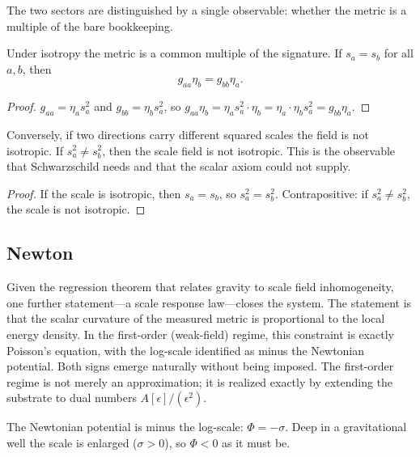 The two sectors are distinguished by a single observable: whether the metric is a multiple of the bare bookkeeping.

\begin{theorem}
Under isotropy the metric is a common multiple of the signature. If $s_a = s_b$ for all $a,b$, then
$$g_{aa}\eta_b = g_{bb}\eta_a.$$
\end{theorem}

\begin{proof}
$g_{aa} = \eta_a s_a^2$ and $g_{bb} = \eta_b s_a^2$, so $g_{aa}\eta_b = \eta_a s_a^2 \cdot \eta_b = \eta_a \cdot \eta_b s_a^2 = g_{bb}\eta_a$.
\end{proof}

\begin{theorem}
Conversely, if two directions carry different squared scales the field is not isotropic. If $s_a^2 \neq s_b^2$, then the scale field is not isotropic. This is the observable that Schwarzschild needs and that the scalar axiom could not supply. 
\end{theorem}

\begin{proof}
If the scale is isotropic, then $s_a = s_b$, so $s_a^2 = s_b^2$. Contrapositive: if $s_a^2 \neq s_b^2$, the scale is not isotropic.
\end{proof}

\subsection{Newton}

Given the regression theorem that relates gravity to scale field inhomogeneity, one further statement---a scale response law---closes the system. The statement is that the scalar curvature of the measured metric is proportional to the local energy density. In the first-order (weak-field) regime, this constraint is exactly Poisson's equation, with the log-scale identified as minus the Newtonian potential. Both signs emerge naturally without being imposed. The first-order regime is not merely an approximation; it is realized exactly by extending the substrate to dual numbers $A[\epsilon]/(\epsilon^2)$.

\begin{definition}
The Newtonian potential is minus the log-scale: $\Phi = -\sigma$. Deep in a gravitational well the scale is enlarged ($\sigma > 0$), so $\Phi < 0$ as it must be. 
\end{definition}


